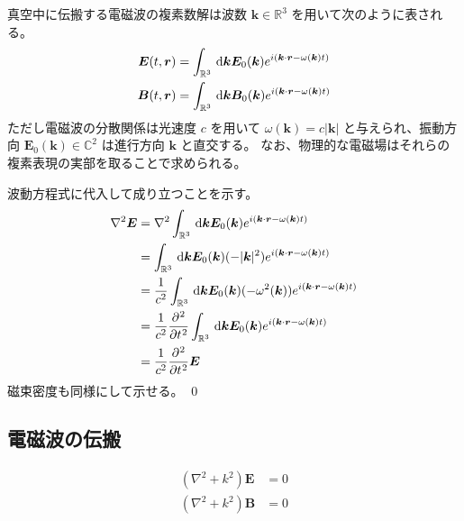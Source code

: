 \documentclass[uplatex,dvipdfmx,a4paper,11pt]{jlreq}
\makeatletter
\newcommand{\CC}{\mathbb{C}}
\newcommand{\RR}{\mathbb{R}}
\newcommand{\EE}{\bm{E}}
\newcommand{\BB}{\bm{B}}
\newcommand{\rr}{\bm{r}}
\newcommand{\kk}{\bm{k}}
\newcommand{\laplacian}{\nabla^2}
\numberwithin{equation}{section}
\theoremstyle{definition}
\renewenvironment{proof}[1][\proofname]{\par
  \normalfont
  \topsep6\p@\@plus6\p@ \trivlist
  \item[\hskip\labelsep{\bfseries #1}\@addpunct{\bfseries}]\ignorespaces\quad\par
}{%
  \qed\endtrivlist\@endpefalse
}
\renewcommand\proofname{証明}
\makeatother
\begin{document}
\begin{theorem}[]
  真空中に伝搬する電磁波の複素数解は波数 $\kk\in\RR^3$ を用いて次のように表される。
  \begin{align}
    \EE(t, \rr) & = \int_{\RR^3}\dl{\kk}\EE_0(\kk)e^{i(\kk\cdot\rr - \omega(\kk)t)} \\
    \BB(t, \rr) & = \int_{\RR^3}\dl{\kk}\BB_0(\kk)e^{i(\kk\cdot\rr - \omega(\kk)t)}
  \end{align}
  ただし電磁波の分散関係は光速度 $c$ を用いて $\omega(\kk) = c|\kk|$ と与えられ、振動方向 $\EE_0(\kk)\in\CC^2$ は進行方向 $\kk$ と直交する。
  なお、物理的な電磁場はそれらの複素表現の実部を取ることで求められる。
\end{theorem}
\begin{proof}
  波動方程式に代入して成り立つことを示す。
  \begin{align}
    \nabla^2\EE & = \nabla^2\int_{\RR^3}\dl{\kk}\EE_0(\kk)e^{i(\kk\cdot\rr - \omega(\kk)t)}                      \\
                & = \int_{\RR^3}\dl{\kk}\EE_0(\kk)(-|\kk|^2)e^{i(\kk\cdot\rr - \omega(\kk)t)}                    \\
                & = \frac{1}{c^2}\int_{\RR^3}\dl{\kk}\EE_0(\kk)(-\omega^2(\kk))e^{i(\kk\cdot\rr - \omega(\kk)t)} \\
                & = \frac{1}{c^2}\diffp[2]{}{t}\int_{\RR^3}\dl{\kk}\EE_0(\kk)e^{i(\kk\cdot\rr - \omega(\kk)t)}   \\
                & = \frac{1}{c^2}\diffp[2]{}{t}\EE
  \end{align}
  磁束密度も同様にして示せる。
\end{proof}

\begin{theorem}[電磁波のエネルギー]
\end{theorem}

\begin{theorem}[電磁波の運動量]
\end{theorem}

\subsection{電磁波の伝搬}
\begin{theorem}
  \begin{align}
    (\laplacian + k^2)\EE & = 0 \\
    (\laplacian + k^2)\BB & = 0
  \end{align}
\end{theorem}
\end{document}
